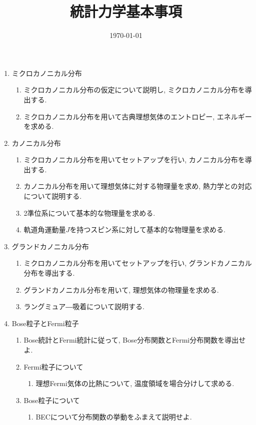 \documentclass[11pt,a4paper]{jarticle}
\title{統計力学基本事項}
\author{}
\date{\today}
\begin{document}
\maketitle
\begin{enumerate}
    \item ミクロカノニカル分布
    \begin{enumerate}
        \item ミクロカノニカル分布の仮定について説明し, ミクロカノニカル分布を導出する.
        \item ミクロカノニカル分布を用いて古典理想気体のエントロピー, エネルギーを求める.
    \end{enumerate}
    \item カノニカル分布
    \begin{enumerate}
        \item ミクロカノニカル分布を用いてセットアップを行い, カノニカル分布を導出する.
        \item カノニカル分布を用いて理想気体に対する物理量を求め, 熱力学との対応について説明する.
        \item 2準位系について基本的な物理量を求める.
        \item 軌道角運動量$J$を持つスピン系に対して基本的な物理量を求める.
    \end{enumerate}
    \item グランドカノニカル分布
    \begin{enumerate}
        \item ミクロカノニカル分布を用いてセットアップを行い, グランドカノニカル分布を導出する.
        \item グランドカノニカル分布を用いて, 理想気体の物理量を求める.
        \item ラングミュア―吸着について説明する.
    \end{enumerate}
    \item Bose粒子とFermi粒子
    \begin{enumerate}
        \item Bose統計とFermi統計に従って, Bose分布関数とFermi分布関数を導出せよ.
        \item Fermi粒子について
        \begin{enumerate}
            \item 理想Fermi気体の比熱について, 温度領域を場合分けして求める.
        \end{enumerate}
        \item Bose粒子について
        \begin{enumerate}
            \item BECについて分布関数の挙動をふまえて説明せよ.
        \end{enumerate}
    \end{enumerate}
\end{enumerate}
\end{document}
